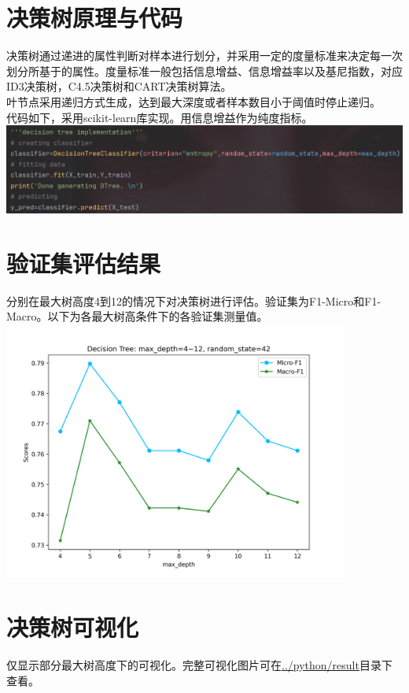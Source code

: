 \documentclass{article}
\begin{document}
\section{决策树原理与代码}
决策树通过递进的属性判断对样本进行划分，并采用一定的度量标准来决定每一次划分所基于的属性。度量标准一般包括信息增益、信息增益率以及基尼指数，对应ID3决策树，C4.5决策树和CART决策树算法。\\
叶节点采用递归方式生成，达到最大深度或者样本数目小于阈值时停止递归。\\
代码如下，采用scikit-learn库实现。用信息增益作为纯度指标。\\
\includegraphics[width=1.0\textwidth]{code_screenshot/DTreeMain.png}\\
\section{验证集评估结果}
分别在最大树高度4到12的情况下对决策树进行评估。验证集为F1-Micro和F1-Macro。以下为各最大树高条件下的各验证集测量值。\\
\includegraphics[width=0.85\textwidth]{../python/result/compare_4_to_12.png}\\
\section{决策树可视化}
仅显示部分最大树高度下的可视化。完整可视化图片可在\href{'../python/result/'}{../python/result}目录下查看。\\
\end{document}
